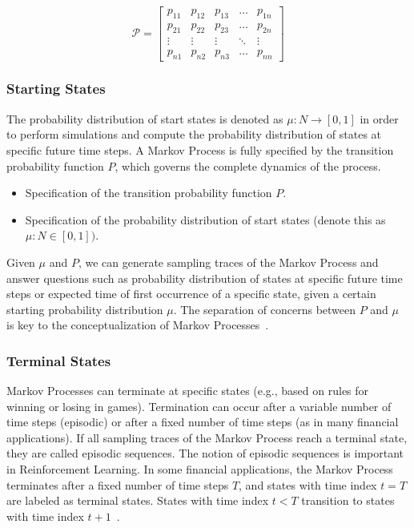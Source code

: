 \documentclass[../xlapes02]{subfiles}
\begin{document}
    \begin{equation}
        \mathcal{P}=\begin{bmatrix}
                        p_{11} & p_{12} & p_{13} & \dots  & p_{1n} \\
                        p_{21} & p_{22} & p_{23} & \dots  & p_{2n} \\
                        \vdots & \vdots & \vdots & \ddots & \vdots \\
                        p_{n1} & p_{n2} & p_{n3} & \dots  & p_{nn}
        \end{bmatrix}
    \end{equation}

    \subsubsection{Starting States}
    The probability distribution of start states is denoted as $\mu : N \rightarrow [0,1]$ in order to perform simulations and compute the probability distribution of states at specific future time steps. A Markov Process is fully specified by the transition probability function $P$, which governs the complete dynamics of the process.
    \begin{itemize}
        \item Specification of the transition probability function $P$.
        \item Specification of the probability distribution of start states (denote this as $\mu : N \in[0, 1])$.
    \end{itemize}
    Given $\mu$ and $P$, we can generate sampling traces of the Markov Process and answer questions such as probability distribution of states at specific future time steps or expected time of first occurrence of a specific state, given a certain starting probability distribution $\mu$. The separation of concerns between $P$ and $\mu$ is key to the conceptualization of Markov Processes~\cite{rao2022foundations}.

    \subsubsection{Terminal States}
    Markov Processes can terminate at specific states (e.g., based on rules for winning or losing in games). Termination can occur after a variable number of time steps (episodic) or after a fixed number of time steps (as in many financial applications). If all sampling traces of the Markov Process reach a terminal state, they are called episodic sequences. The notion of episodic sequences is important in Reinforcement Learning. In some financial applications, the Markov Process terminates after a fixed number of time steps $T$, and states with time index $t = T$ are labeled as terminal states. States with time index $t < T$ transition to states with time index $t + 1$~\cite{rao2022foundations}.
\end{document}
